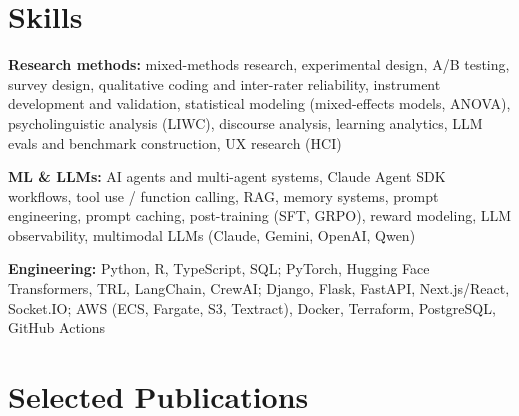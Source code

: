 \documentclass[10pt,letterpaper]{article}
\begin{document}
\section{Skills}

\textbf{Research methods:} mixed-methods research, experimental design, A/B testing, survey design, qualitative coding and inter-rater reliability, instrument development and validation, statistical modeling (mixed-effects models, ANOVA), psycholinguistic analysis (LIWC), discourse analysis, learning analytics, LLM evals and benchmark construction, UX research (HCI)

\smallskip
\textbf{ML \& LLMs:} AI agents and multi-agent systems, Claude Agent SDK workflows, tool use / function calling, RAG, memory systems, prompt engineering, prompt caching, post-training (SFT, GRPO), reward modeling, LLM observability, multimodal LLMs (Claude, Gemini, OpenAI, Qwen)

\smallskip
\textbf{Engineering:} Python, R, TypeScript, SQL; PyTorch, Hugging Face Transformers, TRL, LangChain, CrewAI; Django, Flask, FastAPI, Next.js/React, Socket.IO; AWS (ECS, Fargate, S3, Textract), Docker, Terraform, PostgreSQL, GitHub Actions

\section{Selected Publications}
\end{document}
